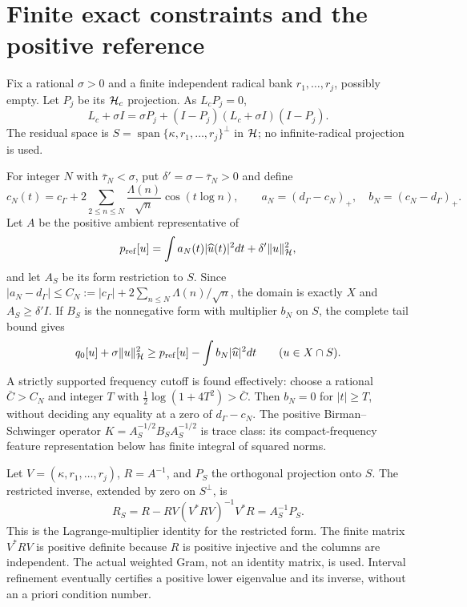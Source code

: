 \documentclass[11pt]{article}
\begin{document}
\section{Finite exact constraints and the positive reference}\label{positive}
Fix a rational $\sigma>0$ and a finite independent radical bank $r_1,\ldots,r_j$, possibly empty. Let $P_j$ be its $\mathcal H_c$ projection. As $L_cP_j=0$,
\begin{equation}\label{decomp}
 L_c+\sigma I=\sigma P_j+(I-P_j)(L_c+\sigma I)(I-P_j).
\end{equation}
The residual space is $S=\operatorname{span}\{\kappa,r_1,\ldots,r_j\}^\perp$ in $\mathcal H$; no infinite-radical projection is used.

For integer $N$ with $\bar\tau_N<\sigma$, put $\delta'=\sigma-\bar\tau_N>0$ and define
\[c_N(t)=c_\Gamma+2\sum_{2\le n\le N}\frac{\Lambda(n)}{\sqrt n}\cos(t\log n),\qquad
 a_N=(d_\Gamma-c_N)_+,\quad b_N=(c_N-d_\Gamma)_+.
\]
Let $A$ be the positive ambient representative of
\[p_{\rm ref}[u]=\int a_N(t)|\widehat u(t)|^2dt+\delta'\lVert u\rVert_{\mathcal H}^2,
\]
and let $A_S$ be its form restriction to $S$. Since $|a_N-d_\Gamma|\le C_N:=|c_\Gamma|+2\sum_{n\le N}\Lambda(n)/\sqrt n$, the domain is exactly $X$ and $A_S\ge\delta'I$. If $B_S$ is the nonnegative form with multiplier $b_N$ on $S$, the complete tail bound gives
\begin{equation}\label{head}
 q_0[u]+\sigma\lVert u\rVert_{\mathcal H}^2\ge p_{\rm ref}[u]-\int b_N|\widehat u|^2dt\qquad(u\in X\cap S).
\end{equation}
A strictly supported frequency cutoff is found effectively: choose a rational $\bar C>C_N$ and integer $T$ with $\tfrac12\log(1+4T^2)>\bar C$. Then $b_N=0$ for $|t|\ge T$, without deciding any equality at a zero of $d_\Gamma-c_N$. The positive Birman--Schwinger operator $K=A_S^{-1/2}B_SA_S^{-1/2}$ is trace class: its compact-frequency feature representation below has finite integral of squared norms.

Let $V=(\kappa,r_1,\ldots,r_j)$, $R=A^{-1}$, and $P_S$ the orthogonal projection onto $S$. The restricted inverse, extended by zero on $S^\perp$, is
\begin{equation}\label{restrictedinverse}
 R_S=R-RV(V^*RV)^{-1}V^*R=A_S^{-1}P_S.
\end{equation}
This is the Lagrange-multiplier identity for the restricted form. The finite matrix $V^*RV$ is positive definite because $R$ is positive injective and the columns are independent. The actual weighted Gram, not an identity matrix, is used. Interval refinement eventually certifies a positive lower eigenvalue and its inverse, without an a priori condition number.
\end{document}
